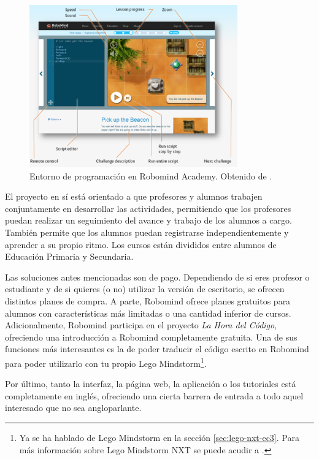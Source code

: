 {{\begin{figure}[!ht]
	\begin{centering}
		\includegraphics[width=0.8\textwidth]{images/robomind-entorno.png}
			\caption{Entorno de programación en Robomind Academy. Obtenido de \cite{robomind-web}.}
				\label{fig:robomind-entorno}
	\end{centering}
\end{figure}


El proyecto en sí está orientado a que profesores y alumnos trabajen conjuntamente en desarrollar las actividades, permitiendo que los profesores puedan realizar un seguimiento del avance y trabajo de los alumnos a cargo. También permite que los alumnos puedan registrarse independientemente y aprender a su propio ritmo. Los cursos están divididos entre alumnos de Educación Primaria y Secundaria. 

Las soluciones antes mencionadas son de pago. Dependiendo de si eres profesor o estudiante y de si quieres (o no) utilizar la versión de escritorio, se ofrecen distintos planes de compra. 
A parte, Robomind ofrece planes gratuitos para alumnos con características más limitadas o una cantidad inferior de cursos. Adicionalmente, Robomind participa en el proyecto \emph{La Hora del Código}\cite{hour-of-code}, ofreciendo una introducción a Robomind completamente gratuita. Una de sus funciones más interesantes es la de poder traducir el código escrito en Robomind para poder utilizarlo con tu propio Lego Mindstorm\footnote{Ya se ha hablado de Lego Mindstorm en la sección \ref{sec:lego-nxt-ec3}. Para más información sobre Lego Mindstorm NXT se puede acudir a \cite{lego-mindstorm}.}.

Por último, tanto la interfaz, la página web, la aplicación o los tutoriales está completamente en inglés, ofreciendo una cierta barrera de entrada a todo aquel interesado que no sea angloparlante. 

}}
